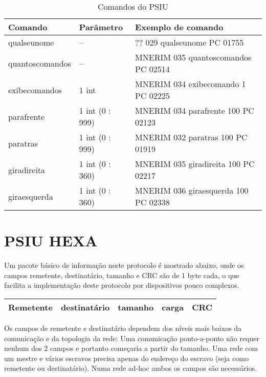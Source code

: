 \documentclass[11pt,	 papera4]{article}
\begin{document}
\begin{table}[h]
	\centering
	\caption{Comandos do PSIU}
	\begin{tabular}{p{3cm}p{2.5cm}p{9cm}}
		\toprule
		Comando &  Parâmetro & Exemplo de comando \\
		\midrule	
		qualseunome & -- & 	?? 029 qualseunome PC 01755\\	
		quantoscomandos & -- & MNERIM 035 quantoscomandos PC 02514\\
		exibecomandos & 1 int & MNERIM 034 exibecomando 1 PC 02225\\
		parafrente & 1 int (0 : 999)  & MNERIM 034 parafrente 100 PC 02123\\
		paratras & 1 int (0 : 999)  & MNERIM 032 paratras 100 PC 01919 \\
		giradireita & 1 int (0 : 360)  & MNERIM 035 giradireita 100 PC 02217\\
		giraesquerda & 1 int (0 : 360)  & MNERIM 036 giraesquerda 100 PC 02338\\
		\bottomrule
	\end{tabular}
	\label{tab:formatoslatex} %
\end{table}
	
\newpage

\part*{PSIU HEXA}


Um pacote básico de informação neste protocolo é mostrado abaixo, onde os campos remetente, destinatário, tamanho e CRC são de 1 byte cada, o que facilita a implementação deste protocolo por dispositivos pouco complexos.


\begin{center}
\begin{tabular}{lllll}
\hline
 Remetente  &  destinatário  &  tamanho  &  carga  &  CRC  \\
\hline
\end{tabular}
\end{center}



Os campos de remetente e destinatário dependem dos níveis mais baixos da comunicação e da topologia da rede: Uma comunicação ponto-a-ponto não requer nenhum dos 2 campos e portanto começaria a partir do tamanho. Uma rede com um mestre e vários escravos precisa apenas do endereço do escravo (seja como remetente ou destinatário). Numa rede ad-hoc ambos os campos são necessários.
\end{document}
